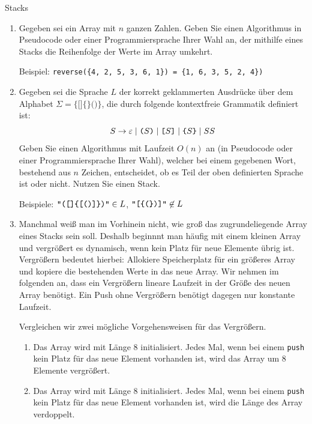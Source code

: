 \documentclass[11pt,a4paper]{article}
\begin{document}
\begin{aufgabe}{3}{Stacks}
    \begin{enumerate}
        \item
        Gegeben sei ein Array mit $n$ ganzen Zahlen.
        Geben Sie einen Algorithmus in Pseudocode oder einer Programmiersprache Ihrer Wahl an, der mithilfe eines Stacks die Reihenfolge der Werte im Array umkehrt.

        Beispiel: \texttt{reverse(\{4, 2, 5, 3, 6, 1\}) = \{1, 6, 3, 5, 2, 4\})}


        \item Gegeben sei die Sprache $L$ der korrekt geklammerten Ausdrücke über dem Alphabet $\Sigma = \{\texttt{[]\{\}()}\}$, die durch folgende kontextfreie Grammatik definiert ist:
        \begin{equation*}
            S \rightarrow
            \epsilon \mid
            \text{\texttt{(}}S\text{\texttt{)}} \mid
            \text{\texttt{[}}S\text{\texttt{]}} \mid
            \text{\texttt{\{}}S\text{\texttt{\}}} \mid
            SS
        \end{equation*}
        Geben Sie einen Algorithmus mit Laufzeit $O(n)$ an (in Pseudocode oder einer Programmiersprache Ihrer Wahl), welcher bei einem gegebenen Wort, bestehend aus $n$ Zeichen, entscheidet, ob es Teil der oben definierten Sprache ist oder nicht.
        Nutzen Sie einen Stack.

        Beispiele: $\text{\texttt{"([]\{[()]\})"}} \in L$, $\text{\texttt{"[\{(\})]"}} \not\in L$

        \item
        Manchmal weiß man im Vorhinein nicht, wie groß das zugrundeliegende Array eines Stacks sein soll.
        Deshalb beginnnt man häufig mit einem \glqq{}kleinen\grqq{} Array und vergrößert es dynamisch, wenn kein Platz für neue Elemente übrig ist.
        Vergrößern bedeutet hierbei: Allokiere Speicherplatz für ein größeres Array und kopiere die bestehenden Werte in das neue Array.
        Wir nehmen im folgenden an, dass ein Vergrößern lineare Laufzeit in der Größe des neuen Array benötigt.
        Ein Push ohne Vergrößern benötigt dagegen nur konstante Laufzeit.

        Vergleichen wir zwei mögliche Vorgehensweisen für das Vergrößern.
        \begin{enumerate}[label=(\roman*)]
            \item Das Array wird mit Länge 8 initialisiert.
            Jedes Mal, wenn bei einem \texttt{push} kein Platz für das neue Element vorhanden ist, wird das Array um 8 Elemente vergrößert.
            \item Das Array wird mit Länge 8 initialisiert.
            Jedes Mal, wenn bei einem \texttt{push} kein Platz für das neue Element vorhanden ist, wird die Länge des Array verdoppelt.
        \end{enumerate}


\end{enumerate}
\end{aufgabe}
\end{document}
